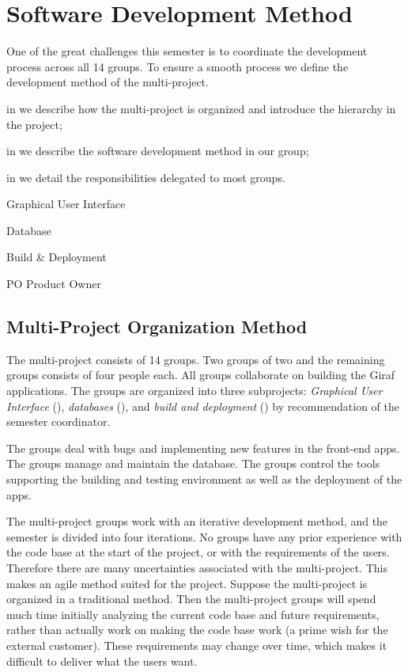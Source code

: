 \chapter{Software Development Method}\label{chap:sw_dev_method}
One of the great challenges this semester is to coordinate the development process across all 14 groups. To ensure a smooth process we define the development method of the multi-project.

\begin{chapterorganization}
  \item in  we describe how the multi-project is organized and introduce the hierarchy in the project;
  \item in  we describe the software development method in our group;
  \item in  we detail the responsibilities delegated to most groups.
\end{chapterorganization}

\begin{abbreviations}
  \item[\gui] Graphical User Interface
  \item[\db] Database
  \item[\bd] Build \& Deployment
  \item[PO] Product Owner
\end{abbreviations}

\section{Multi-Project Organization Method}\label{sec:project_overview}
The multi-project consists of 14 groups. Two groups of two and the remaining groups consists of four people each.  All groups collaborate on building the Giraf applications. The groups are organized into three subprojects: \emph{Graphical User Interface} (\gui), \emph{databases} (\db), and \emph{build and deployment} (\bd) by recommendation of the semester coordinator.

The \gui groups deal with bugs and implementing new features in the front-end apps. The \db groups manage and maintain the database. The \bd groups control the tools supporting the building and testing environment as well as the deployment of the apps.

The multi-project groups work with an iterative development method, and the semester is divided into four iterations. No groups have any prior experience with the code base at the start of the project, or with the requirements of the users. Therefore there are many uncertainties associated with the multi-project. This makes an agile method suited for the project. Suppose the multi-project is organized in a traditional method. Then the multi-project groups will spend much time initially analyzing the current code base and future requirements, rather than actually work on making the code base work (a prime wish for the external customer). These requirements may change over time, which makes it difficult to deliver what the users want.

